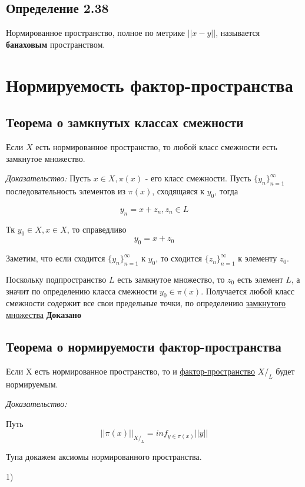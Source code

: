 \documentclass[12pt]{article}
\begin{document}
\subsection*{Определение 2.38}
	Нормированное пространство, полное по метрике $||x - y||$, называется \textbf{банаховым} пространством.	

\newpage
\section{Нормируемость фактор-пространства}	
	
\subsection{Теорема о замкнутых классах смежности}

	Если $X$ есть нормированное пространство, то любой класс смежности есть замкнутое множество.
	
	\textit{Доказательство:}
	Пусть $x \in X , \pi(x)$ - его класс смежности. 
	Пусть $\{ y_n \}_{n = 1}^{\infty}$ последовательность элементов из $\pi(x)$, сходящаяся к $y_0$, тогда
	
	$$y_n = x + z_n , z_n \in L $$
	
	Тк $y_0 \in X, x \in X$, то справедливо 
	$$y_0 = x + z_0$$
	
	Заметим, что если сходится  $\{ y_n \}_{n = 1}^{\infty}$ к $y_0$, то сходится $\{ z_n \}_{n = 1}^{\infty}$ к элементу $z_0$. 

 Поскольку подпространство $L$ есть замкнутое множество,
то $z_0$ есть элемент $L$, а значит по определению класса смежности $y_0 \in \pi(x)$. Получается любой класс смежности содержит все свои предельные точки, по определению \hyperref[eq101]{замкнутого множества} \textbf{Доказано}
	
\subsection{Теорема о нормируемости фактор-пространства}
	Если X есть нормированное пространство,
то и \hyperref[eq102]{фактор-пространство} $X\text{/}_L$ будет нормируемым.
		
\textit{Доказательство:} 

	Путь $$||\pi(x)||_{X\text{/}_L} = inf_{y \in \pi(x)} ||y|| $$
	
Тупа докажем аксиомы нормированного пространства.

1) 	
	
	
	
\end{document}

